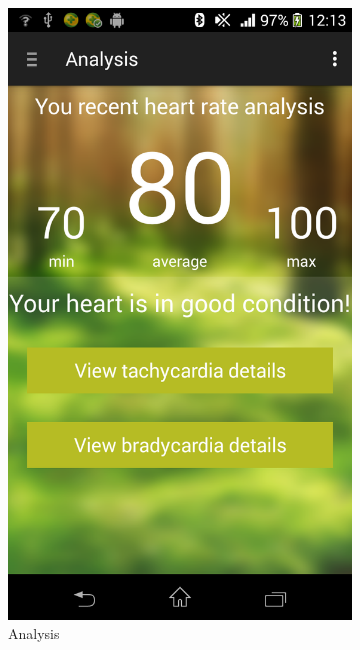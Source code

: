\begin{figure}
\begin{subfigure}{.24\textwidth}
  \includegraphics[width=.8\linewidth]{img/screenshot/ss4.png}
  \caption{Analysis}
\end{subfigure}
\begin{subfigure}{.24\textwidth}
  \centering

\end{subfigure}
\end{figure}
